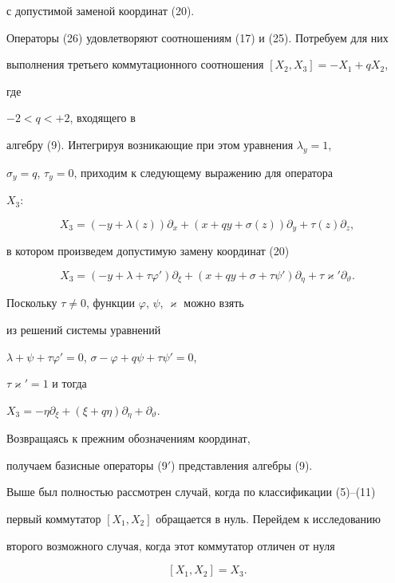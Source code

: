 с допустимой заменой координат (20). 


 


Операторы (26) удовлетворяют соотношениям (17) и (25). Потребуем для них 


выполнения третьего коммутационного соотношения $[X_2,X_3]=-X_1+qX_2$, 


где 


$-2<q<+2$, входящего в 


алгебру (9). Интегрируя возникающие при этом уравнения $\lambda_y=1$, 


$\sigma_y=q$, $\tau_y=0$, приходим к следующему выражению для оператора 


$X_3$: 


$$ 


X_3=(-y+\lambda(z))\partial_x+(x+qy+\sigma(z))\partial_y+ 


\tau(z)\partial_z, 


$$ 


в котором произведем допустимую замену координат (20)


$$ 


X_3=(-y+\lambda+\tau\varphi')\partial_\xi+ 


(x+qy+\sigma+\tau\psi')\partial_\eta+ 


\tau\varkappa'\partial_\vartheta. 


$$ 


Поскольку $\tau\ne 0$, функции $\varphi$, $\psi$, $\varkappa$ можно взять 


из решений системы уравнений 


$\lambda+\psi+\tau\varphi'=0$, $\sigma-\varphi+q\psi+\tau\psi'=0$, 


$\tau\varkappa'=1$ и тогда 


$X_3=-\eta\partial_\xi+(\xi+q\eta)\partial_\eta+\partial_\vartheta$. 


Возвращаясь к прежним обозначениям координат, 


получаем базисные операторы (9${}'$) представления алгебры (9). 


 


Выше был полностью рассмотрен случай, когда по классификации (5)--(11) 


первый коммутатор $[X_1,X_2]$ обращается в нуль. Перейдем к исследованию 


второго возможного случая, когда этот коммутатор отличен от нуля


\begin{equation} 


[X_1,X_2]=X_3. 


\end{equation} 


